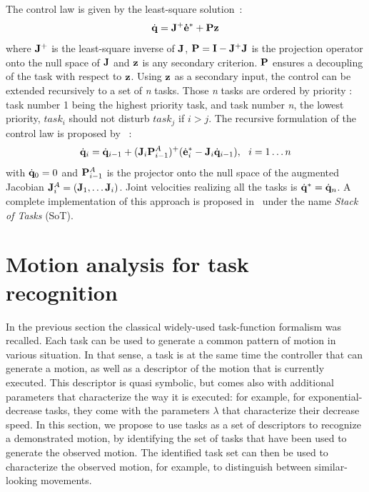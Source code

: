 \documentclass[journal]{IEEEtran}
\begin{document}
The control law is given by the least-square solution~\cite{liegeois77}:
\begin{equation}
\dot{\mbf{q}} = \mbf{J}^+ \mbf{\dot{e}}^* + \mbf{P}\mbf{z}
\label{eq:ltsq}
\end{equation}
where ${\mathbf{J}}^+$ is the least-square inverse of ${\mathbf{J}}$,
${\mathbf{P}} = {\mathbf{I}} - {\mathbf{J}}^+ {\mathbf{J}}$ is the projection operator onto the null space
of ${\mathbf{J}}$ and ${\mathbf{z}}$ is any secondary criterion. ${\mathbf{P}}$ ensures
a decoupling of the task with respect to ${\mathbf{z}}$. 
Using ${\mathbf{z}}$ as a secondary input, the control can be extended
recursively to a set of \emph{n} tasks. Those \emph{n} tasks
are ordered by priority : task number 1 being the highest priority task,
and task number \emph{n}, the lowest priority,
$task_i$ should not disturb $task_j$ if $i>j$.
The recursive formulation of the control law is proposed by~\cite{siciliano91} :
\begin{equation}
\dot{{\mathbf{q}}}_i = \dot{{\mathbf{q}}}_{i-1} + ({\mathbf{J}}_i {\mathbf{P}}_{i-1}^{A})^+
(\dot{{\mathbf{e}}}^*_i - {\mathbf{J}}_i \dot{{\mathbf{q}}}_{i-1}) , \ \ i = 1 \ldots n
\end{equation}
\noindent with $\dot{{\mathbf{q}}}_0 = 0$ and ${\mathbf{P}}_{i-1}^{A}$ is
the projector onto the null space of the augmented Jacobian
${\mathbf{J}}_i^A = ({\mathbf{J}}_1, \ldots {\mathbf{J}}_i)$. Joint velocities realizing all 
the tasks is $\dot{{\mathbf{q}}}^* = \dot{{\mathbf{q}}}_n$.
A complete implementation of this approach is proposed in~\cite{mansard07} under the
name \emph{Stack of Tasks} (SoT). 

\section{Motion analysis for task recognition} 
\label{sec:detect}
\label{section:algorithm}
In the previous section the classical widely-used task-function formalism was recalled.
Each task can be used to generate a common pattern of motion in various situation.
In that sense, a task is at the same time the controller that can
generate a motion, as well as a descriptor of the motion that is currently executed.
This descriptor is quasi symbolic, but comes also with additional parameters
that characterize the way it is executed: for example, for exponential-decrease tasks,
they come with the parameters $\lambda$ that characterize their decrease speed. In this section,
we propose to use tasks as a set of descriptors to recognize a demonstrated motion,
by identifying the set of tasks that have been used to
generate the observed motion.
The identified task set can then be used to characterize the observed motion, for
example, to distinguish between similar-looking movements.
\end{document}

